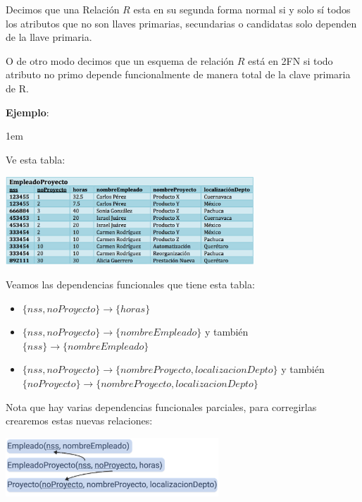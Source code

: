 \documentclass[12pt, fleqn]{report}                             %
\newenvironment{SmallIndentation}[1][0.75em]                    %
        {\begin{adjustwidth}{#1}{}\begin{footnotesize}}             %
        {\end{footnotesize}\end{adjustwidth}}                       %
\theoremstyle{break}                                            %
\begin{document}
                Decimos que una Relación $R$ esta en su segunda forma normal
                si y solo sí todos los atributos que no son llaves primarias, secundarias
                o candidatas solo dependen de la llave primaria.

                O de otro modo decimos que un esquema de relación $R$ está en 2FN si
                todo atributo no primo depende funcionalmente de manera total de la
                clave primaria de R.

                \clearpage
                \textbf{Ejemplo}:
                \begin{SmallIndentation}[1em]

                    Ve esta tabla:

                    \includegraphics[width=0.70\textwidth]{EjemploParaNormalizarA2FN}
                    
                    Veamos las dependencias funcionales que tiene esta tabla:
                    \begin{itemize}
                        \item $\{nss, noProyecto\} \to \{horas\}$
                        \item $\{nss, noProyecto\} \to \{nombreEmpleado\}$ y también
                            $\{nss\} \to \{nombreEmpleado\}$ 
                        \item $\{nss, noProyecto\} \to \{nombreProyecto, localizacionDepto\}$ y también \\
                            $\{noProyecto\} \to \{nombreProyecto, localizacionDepto\}$
                    \end{itemize}

                    Nota que hay varias dependencias funcionales parciales, para corregirlas crearemos
                    estas nuevas relaciones:

                    \includegraphics[width=0.60\textwidth]{EjemploParaNormalizarA2FN2}

                \end{SmallIndentation}
                 
\end{document}
